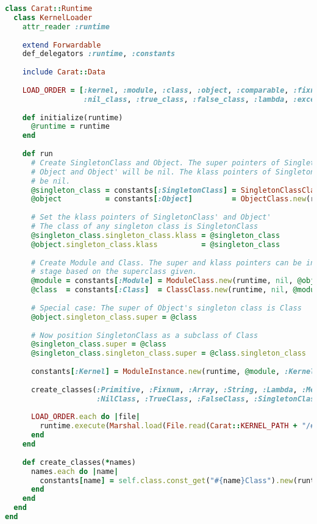 \begin{lstlisting}[title={\small\Helvetica runtime/kernel\_loader.rb},language=Ruby]
class Carat::Runtime
  class KernelLoader
    attr_reader :runtime
  
    extend Forwardable
    def_delegators :runtime, :constants
    
    include Carat::Data
    
    LOAD_ORDER = [:kernel, :module, :class, :object, :comparable, :fixnum, :array, :string,
                  :nil_class, :true_class, :false_class, :lambda, :exception]
    
    def initialize(runtime)
      @runtime = runtime
    end
    
    def run
      # Create SingletonClass and Object. The super pointers of SingletonClass, SingletonClass',
      # Object and Object' will be nil. The klass pointers of SingletonClass' and Object' will also
      # be nil.
      @singleton_class = constants[:SingletonClass] = SingletonClassClass.new(runtime, nil, nil)
      @object          = constants[:Object]         = ObjectClass.new(runtime, nil, nil)
      
      # Set the klass pointers of SingletonClass' and Object'
      # The class of any singleton class is SingletonClass
      @singleton_class.singleton_class.klass = @singleton_class
      @object.singleton_class.klass          = @singleton_class
      
      # Create Module and Class. The super and klass pointers can be inferred correctly at this 
      # stage based on the superclass given.
      @module = constants[:Module] = ModuleClass.new(runtime, nil, @object)
      @class  = constants[:Class]  = ClassClass.new(runtime, nil, @module)
      
      # Special case: The super of Object's singleton class is Class
      @object.singleton_class.super = @class
      
      # Now position SingletonClass as a subclass of Class
      @singleton_class.super = @class
      @singleton_class.singleton_class.super = @class.singleton_class
      
      constants[:Kernel] = ModuleInstance.new(runtime, @module, :Kernel)
      
      create_classes(:Primitive, :Fixnum, :Array, :String, :Lambda, :Method,
                     :NilClass, :TrueClass, :FalseClass, :SingletonClass)
      
      LOAD_ORDER.each do |file|
        runtime.execute(Marshal.load(File.read(Carat::KERNEL_PATH + "/#{file}.marshal")))
      end
    end
    
    def create_classes(*names)
      names.each do |name|
        constants[name] = self.class.const_get("#{name}Class").new(runtime, @class, @object)
      end
    end
  end
end

\end{lstlisting}
